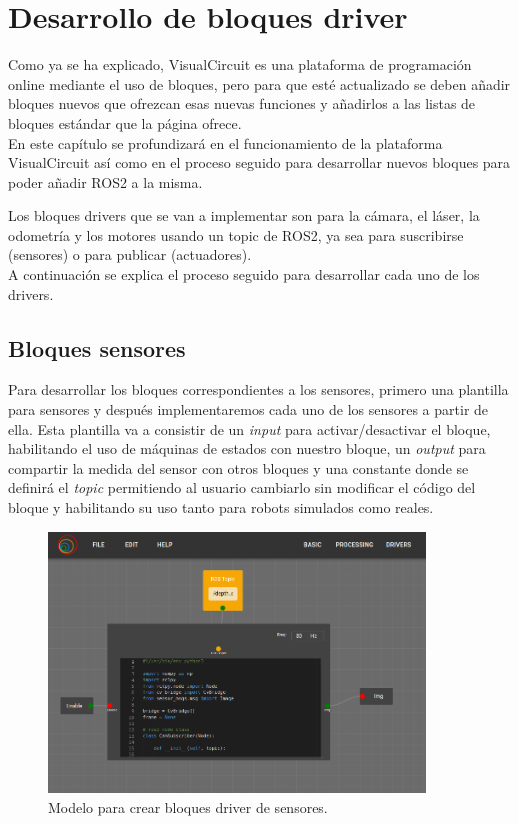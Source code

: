 \chapter{Desarrollo de bloques driver}
\label{cap:capitulo4}
Como ya se ha explicado, VisualCircuit es una plataforma de programación online mediante el uso de bloques, pero para que esté actualizado
se deben añadir bloques nuevos que ofrezcan esas nuevas funciones y añadirlos a las listas de bloques estándar que la página ofrece.\\
En este capítulo se profundizará en el funcionamiento de la plataforma VisualCircuit así como en el proceso seguido para desarrollar nuevos
bloques para poder añadir ROS2 a la misma.

Los bloques drivers que se van a implementar son para la cámara, el láser, la odometría y los motores usando un topic de ROS2, ya sea
para suscribirse (sensores) o para publicar (actuadores).\\
A continuación se explica el proceso seguido para desarrollar cada uno de los drivers.

\section{Bloques sensores}
\label{sec:blocks_sensores}

Para desarrollar los bloques correspondientes a los sensores, primero  una plantilla para sensores y después implementaremos cada uno de
los sensores a partir de ella. Esta plantilla va a consistir de un \textit{input} para activar/desactivar el bloque, habilitando el uso de máquinas
de estados con nuestro bloque, un \textit{output} para compartir la medida del sensor con otros bloques y una constante donde se definirá
el \textit{topic} permitiendo al usuario cambiarlo sin modificar el código del bloque y habilitando su uso tanto para robots simulados como reales.\\
\begin{figure} [H]
  \begin{center}
      \includegraphics[width=10cm]{figs/c4/VC_driver_blocks.png}
  \end{center}
  \caption[Modelo bloque driver sensores]{Modelo para crear bloques driver de sensores.}
  \label{fig:VC_driver_model}
\end{figure}

